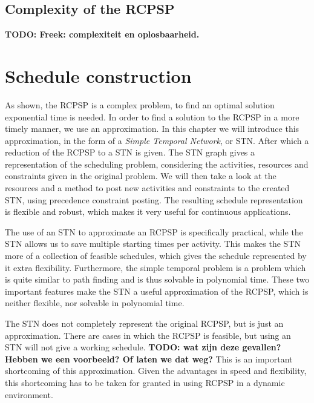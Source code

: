 \documentclass{article}
\theoremstyle{definition}
\newcommand{\TODO}[1]{{\color{red}\textbf{TODO: #1}}}
\begin{document}
\subsection{Complexity of the RCPSP}
\label{text:complex}
\TODO{Freek: complexiteit en oplosbaarheid.}


\newpage


\section{Schedule construction}
\label{text:schedule}

As shown, the RCPSP is a complex problem, to find an optimal solution exponential time is needed.
In order to find a solution to the RCPSP in a more timely manner, we use an approximation.
In this chapter we will introduce this approximation, in the form of a \emph{Simple Temporal Network}, or STN.
After which a reduction of the RCPSP to a STN is given.
The STN graph gives a representation of the scheduling problem, considering the activities, resources and constraints given in the original problem.
We will then take a look at the resources and a method to post new activities and constraints to the created STN, using precedence constraint posting.
The resulting schedule representation is flexible and robust, which makes it very useful for continuous applications.

The use of an STN to approximate an RCPSP is specifically practical, while the STN allows us to save multiple starting times per activity.
This makes the STN more of a collection of feasible schedules, which gives the schedule represented by it extra flexibility.
Furthermore, the simple temporal problem is a problem which is quite similar to path finding and is thus solvable in polynomial time.
These two important features make the STN a useful approximation of the RCPSP, which is neither flexible, nor solvable in polynomial time.

The STN does not completely represent the original RCPSP, but is just an approximation.
There are cases in which the RCPSP is feasible, but using an STN will not give a working schedule.
\TODO{wat zijn deze gevallen? Hebben we een voorbeeld? Of laten we dat weg?}
This is an important shortcoming of this approximation.
Given the advantages in speed and flexibility, this shortcoming has to be taken for granted in using RCPSP in a dynamic environment.
\end{document}
